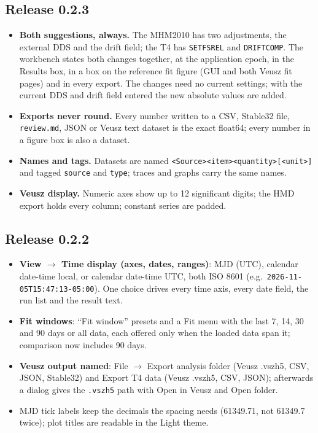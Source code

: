 \documentclass[11pt,a4paper]{article}
\renewcommand{\_}{\usscore\allowbreak}
\begin{document}
\subsection{Release 0.2.3}
\begin{itemize}
\item \textbf{Both suggestions, always.} The MHM2010 has two adjustments, the external DDS and the
drift field; the T4 has \texttt{SETFSREL} and \texttt{DRIFTCOMP}. The workbench states both changes
together, at the application epoch, in the Results box, in a box on the reference fit figure (GUI and
both Veusz fit pages) and in every export. The changes need no current settings; with the current
DDS and drift field entered the new absolute values are added.
\item \textbf{Exports never round.} Every number written to a CSV, Stable32 file, \texttt{review.md},
JSON or Veusz text dataset is the exact float64; every number in a figure box is also a dataset.
\item \textbf{Names and tags.} Datasets are named \texttt{<Source>\_<item>\_<quantity>[\_<unit>]}
and tagged \texttt{source\_*} and \texttt{type\_*}; traces and graphs carry the same names.
\item \textbf{Veusz display.} Numeric axes show up to 12 significant digits; the HMD export holds
every column; constant series are padded.
\end{itemize}

\subsection{Release 0.2.2}
\begin{itemize}
\item \textbf{View $\rightarrow$ Time display (axes, dates, ranges)}: MJD (UTC), calendar date-time
local, or calendar date-time UTC, both ISO 8601 (e.g.\ \texttt{2026-11-05T15:47:13-05:00}). One choice
drives every time axis, every date field, the run list and the result text.
\item \textbf{Fit windows}: ``Fit window'' presets and a Fit menu with the last 7, 14, 30 and 90 days
or all data, each offered only when the loaded data span it; comparison now includes 90 days.
\item \textbf{Veusz output named}: File $\rightarrow$ Export analysis folder (Veusz .vszh5, CSV, JSON,
Stable32) and Export T4 data (Veusz .vszh5, CSV, JSON); afterwards a dialog gives the
\texttt{.vszh5} path with Open in Veusz and Open folder.
\item MJD tick labels keep the decimals the spacing needs (61349.71, not 61349.7 twice); plot
titles are readable in the Light theme.
\end{itemize}
\end{document}
